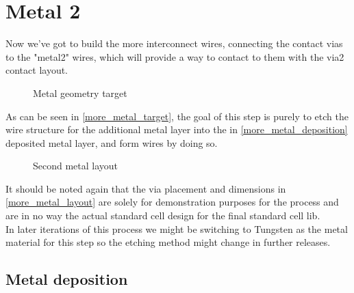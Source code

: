 \section{Metal 2}\label{more_metal}
Now we've got to build the more interconnect wires, connecting the contact vias to the "metal2" wires, which will provide a way to contact to them with the via2 contact layout.

\begin{figure}[H]
	\centering
	\begin{tikzpicture}[node distance = 3cm, auto, thick,scale=\CrossAndTopSectionBig, every node/.style={transform shape}]
		
	\end{tikzpicture}
	\begin{tikzpicture}[node distance = 3cm, auto, thick,scale=\CrossAndTopSectionBig, every node/.style={transform shape}]
		
	\end{tikzpicture}
	\caption{Metal geometry target}
	\label{more_metal_target}
\end{figure}

As can be seen in \autoref{more_metal_target}, the goal of this step is purely to etch the wire structure for the additional metal layer into the in \autoref{more_metal_deposition} deposited metal layer, and form wires by doing so.

\begin{figure}[H]
	\centering
	\begin{tikzpicture}[node distance =1cm, auto, thick,scale=\VLSILayout, every node/.style={transform shape}]
		
	\end{tikzpicture}
	\caption{Second metal layout}
	\label{more_metal_layout}
\end{figure}

It should be noted again that the via placement and dimensions in \autoref{more_metal_layout} are solely for demonstration purposes for the process and are in no way the actual standard cell design for the final standard cell lib. \\

In later iterations of this process we might be switching to Tungsten as the metal material for this step so the etching method might change in further releases.

\newpage

\subsection{Metal deposition}\label{more_metal_deposition}


